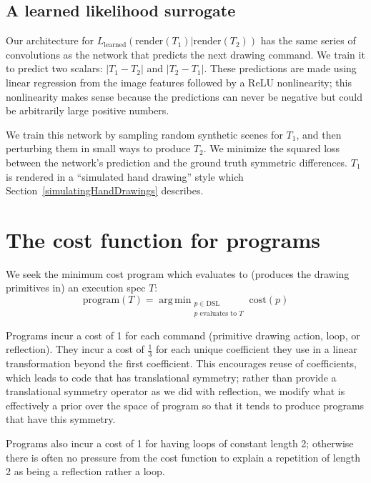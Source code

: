 \documentclass{article}
\DeclareMathOperator*{\argmin}{arg\,min} %
\DeclareMathOperator{\argmin}{argmin} %
\begin{document}
\subsection{A learned likelihood surrogate}

Our architecture for
$L_{\text{learned}}(\text{render}(T_1)|\text{render}(T_2))$ has the
same series of convolutions as the network that predicts the next
drawing command. We train it to predict two scalars: $|T_1 - T_2|$ and
$|T_2 - T_1|$.  These predictions are made using linear regression
from the image features followed by a ReLU nonlinearity; this
nonlinearity makes sense because the predictions can never be negative
but could be arbitrarily large positive numbers.

We train this network by sampling random synthetic scenes for $T_1$,
and then perturbing them in small ways to produce $T_2$.
We minimize the squared loss between the network's prediction and the ground truth symmetric differences.
$T_1$ is rendered in a ``simulated hand drawing'' style which Section~\ref{simulatingHandDrawings} describes.

\section{The cost function for programs}

We seek the minimum cost program which evaluates to (produces the drawing primitives in) an execution spec $T$:
\begin{equation}
  \text{program}(T) = \argmin_{\substack{p\in \text{DSL}\\p \text{ evaluates to } T}} \text{cost}(p)\label{programObjective}
\end{equation}

Programs incur a cost of 1 for each command (primitive drawing action,
loop, or reflection).  They incur a cost of $\frac{1}{3}$ for each
unique coefficient they use in a linear transformation beyond the
first coefficient. This encourages reuse of coefficients, which leads
to code that has translational symmetry; rather than provide a
translational symmetry operator as we did with reflection, we modify
what is effectively a prior over the space of program so that it tends
to produce programs that have this symmetry.

Programs also incur a cost of 1 for having loops of constant length 2;
otherwise there is often no pressure from the cost function to explain
a repetition of length 2 as being a reflection rather a loop.
\end{document}
